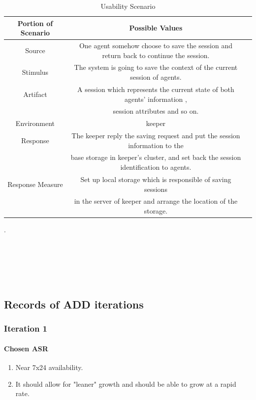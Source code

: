 \documentclass{article}
\begin{document}
	\begin{center}
		\begin{table}[!htb]
		\begin{tabular}{ccc}
		\toprule  
		Portion of Scenario & Possible Values\\
		\midrule 
		Source 	& One agent somehow choose to save the session and return back to continue the session.\\
		Stimulus & The system is going to save the context of the current session of agents.\\
		Artifact & A session which represents the current state of both agents' information , \\
		& session attributes and so on.\\
		Environment & keeper \\
		Response & The keeper reply the saving request and put the session information to the \\
		& base storage in keeper's cluster, and set back the session identification to agents.\\
		Response Measure & Set up local storage which is responsible of saving sessions\\
		& in the server of keeper and arrange the location of the storage.\\
		\bottomrule
		\end{tabular}
		\caption{Usability Scenario}
		\end{table}
	\end{center}
\newpage
.
\\
\\ 
\\
\\
\\
\\

	\subsection{Records of ADD iterations}
		\subsubsection{Iteration 1}
			\paragraph{Chosen ASR}
			\begin{enumerate}
			\item Near 7x24 availability.
			\item It should allow for "leaner" growth and should be able to grow at a rapid rate.
			\end{enumerate}
\end{document}
